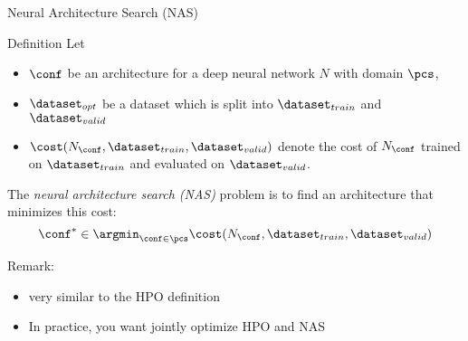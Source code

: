 \begin{frame}[c]{Neural Architecture Search (NAS)}

\begin{block}{Definition}
	Let 
	\begin{itemize}
		\item $\conf$ be \alert{an architecture for a deep neural network $N$} with domain $\pcs$,
		\item $\dataset_{opt}$ be a dataset which is split into $\dataset_{train}$ and $\dataset_{valid}$ 
		\item $\cost(N_{\conf}, \dataset_{train}, \dataset_{valid})$ denote the cost of $N_{\conf}$ trained on $\dataset_{train}$ and evaluated on $\dataset_{valid}$.
	\end{itemize}
	The \emph{neural architecture search (NAS)} problem is to find an architecture that minimizes this cost:
	\begin{equation}
	\conf^* \in \argmin_{\conf \in \pcs} \cost(N_{\conf}, \dataset_{train}, \dataset_{valid}) \nonumber  
	\end{equation}
\end{block}

\pause
\smallskip
Remark:
\begin{itemize}
	\item very similar to the HPO definition
	\pause
	\item In practice, you want jointly optimize HPO and NAS~
\end{itemize}

\end{frame}
